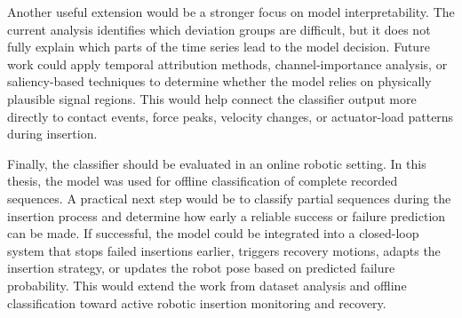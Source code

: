 Another useful extension would be a stronger focus on model interpretability. The current analysis identifies which deviation groups are difficult, but it does not fully explain which parts of the time series lead to the model decision. Future work could apply temporal attribution methods, channel-importance analysis, or saliency-based techniques to determine whether the model relies on physically plausible signal regions. This would help connect the classifier output more directly to contact events, force peaks, velocity changes, or actuator-load patterns during insertion.

Finally, the classifier should be evaluated in an online robotic setting. In this thesis, the model was used for offline classification of complete recorded sequences. A practical next step would be to classify partial sequences during the insertion process and determine how early a reliable success or failure prediction can be made. If successful, the model could be integrated into a closed-loop system that stops failed insertions earlier, triggers recovery motions, adapts the insertion strategy, or updates the robot pose based on predicted failure probability. This would extend the work from dataset analysis and offline classification toward active robotic insertion monitoring and recovery.